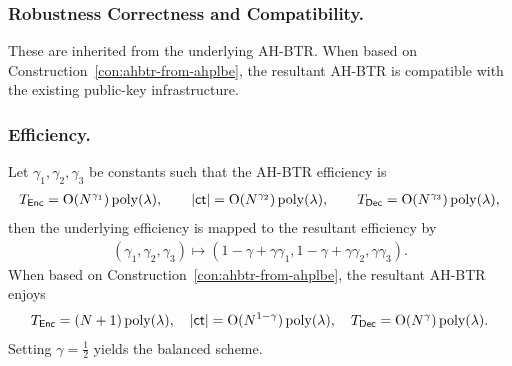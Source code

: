 \subsubsection{Robustness Correctness and Compatibility.}
These are inherited from the underlying AH-BTR.
When based on Construction~\ref{con:ahbtr-from-ahplbe},
the resultant AH-BTR is compatible with the existing public-key infrastructure.

\subsubsection{Efficiency.}
Let $\gamma_1,\gamma_2,\gamma_3$ be constants such that the AH-BTR efficiency is
\begin{align*}
T_{\smash{\mathsf{Enc}}}=\operatorname{O}(N^{\gamma_1})\operatorname{poly}(\lambda),\qquad
|{\smash{\mathsf{ct}}}|=\operatorname{O}(N^{\gamma_2})\operatorname{poly}(\lambda),\qquad
T_{\smash{\mathsf{Dec}}}=\operatorname{O}(N^{\gamma_3})\operatorname{poly}(\lambda),
\end{align*}
then the underlying efficiency is mapped to the resultant efficiency by
\begin{align*}
(\gamma_1,\gamma_2,\gamma_3)\mapsto
(1-\gamma+\gamma\gamma_1,1-\gamma+\gamma\gamma_2,\gamma\gamma_3).
\end{align*}
When based on Construction~\ref{con:ahbtr-from-ahplbe},
the resultant AH-BTR enjoys
\begin{align*}
T_{\smash{\mathsf{Enc}}}=({N+1})\operatorname{poly}(\lambda),\quad
|{\smash{\mathsf{ct}}}|=\operatorname{O}(N^{1-\gamma})\operatorname{poly}(\lambda),\quad
T_{\smash{\mathsf{Dec}}}=\operatorname{O}(N^\gamma)\operatorname{poly}(\lambda).
\end{align*}
Setting ${\gamma=\frac12}$ yields the balanced scheme.
